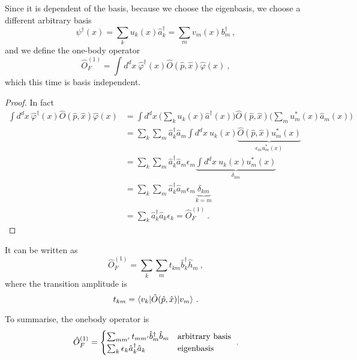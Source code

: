     Since it is dependent of the basis, because we choose the eigenbasis, we choose a different arbitrary basis 
    \begin{equation*}
        \psi^\dagger (x) = \sum_k u_k (x) \hat a^\dagger_k = \sum_m v_m (x) b^\dagger_m ~,
    \end{equation*}
    and we define the one-body operator
    \begin{equation}\label{basind}
        \hat O^{(1)}_F = \int d^d x ~ \hat \varphi^\dagger (x) \hat O (\hat p, \hat x) \hat \varphi (x) ~,
    \end{equation}
    which this time is basis independent.
    \begin{proof}
        In fact 
        \begin{equation*}
        \begin{aligned}
            \int d^d x ~ \hat \varphi^\dagger (x) \hat O (\hat p, \hat x) \hat \varphi (x) & = \int d^d x ~ \Big ( \sum_k u_k(x) \hat a^\dagger (x) \Big ) \hat O (\hat p, \hat x) \Big ( \sum_m u_m^* (x) \hat a_m (x) \Big ) \\ & = \sum_k \sum_m \hat a_k^\dagger \hat a_m \int d^d x ~ u_k (x) \underbrace{\hat O(\hat p, \hat x) u^*_m (x)}_{\epsilon_m u^*_m (x)} \\ & = \sum_k \sum_m \hat a_k^\dagger \hat a_m \epsilon_m \underbrace{\int d^d x ~ u_k (x) u^*_m (x)}_{\delta_{km}} \\ & = \sum_k \sum_m \hat a_k^\dagger \hat a_m \epsilon_m \underbrace{\delta_{km}}_{k = m} \\ & = \sum_k\hat a_k^\dagger \hat a_k \epsilon_k = \hat O^{(1)}_F ~.
        \end{aligned}
        \end{equation*}
    \end{proof}
    It can be written as 
    \begin{equation*}
        \hat O^{(1)}_F = \sum_k \sum_m t_{km} \hat b_k^\dagger \hat h_m ~,
    \end{equation*}
    where the transition amplitude is
    \begin{equation*}
        t_{km} = \langle v_k\vert \hat O (\hat p, \hat x) \vert v_m\rangle ~.
    \end{equation*}

    To summarise, the onebody operator is 
    \begin{equation*}
        \hat O^{(1)}_F = \begin{cases}
            \sum_{m m'} t_{mm'} \hat b^\dagger_m \hat b_m & \textnormal{arbitrary basis} \\
            \sum_k \epsilon_k \hat a^\dagger_k \hat a_k & \textnormal{eigenbasis} \\
        \end{cases} ~.
    \end{equation*}


